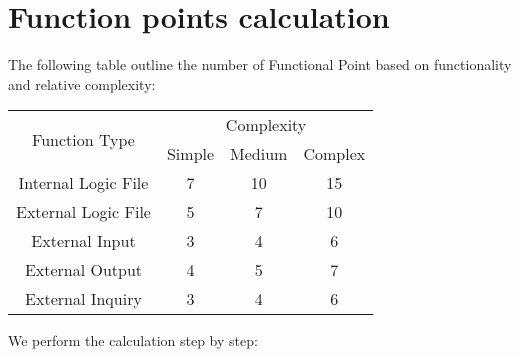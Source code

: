 \documentclass[12pt, oneside]{book}   	%
\begin{document}
\section{Function points calculation}
The following table outline the number of Functional Point based on functionality and relative complexity:
\begin{table}[h]
\centering
\begin{tabular}{|c |c |c|c |}
\hline
\multirow{2}{*}{Function Type} & \multicolumn{3}{|c|}{Complexity}\\  \cline{2-4}
&Simple & Medium&Complex\\ 
\hline
\hline
Internal Logic File & 7 & 10 & 15 \\
\hline
External Logic File & 5 & 7 & 10\\
\hline
External Input & 3 & 4 & 6\\
\hline
External Output & 4 & 5 & 7\\
\hline
External Inquiry & 3 & 4 & 6\\
\hline
\end{tabular}
\end{table}
We perform the calculation step by step:
\end{document}
